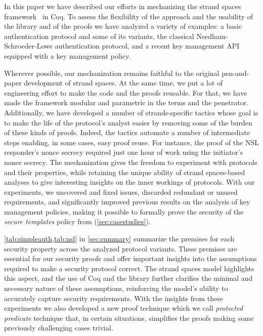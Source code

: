 

In this paper we have described our efforts in mechanizing the strand spaces framework~\cite{FHG98} in Coq.
To assess the flexibility of the approach and the usability of the library and of the proofs we have analyzed a variety of examples: a basic authentication protocol and some of its variants, the classical Needham-Schroeder-Lowe authentication protocol, and a recent key management API equipped with a key management policy.

Wherever possible, our mechanization remains faithful to the original pen-and-paper development of strand spaces.
At the same time, we put a lot of engineering effort to make the code and the proofs reusable.
For that, we have made the framework modular and parametric in the terms and the penetrator.
Additionally, we have developed a number of strands-specific tactics whose goal is to make the life of the protocol's analyst easier by removing some of the burden of these kinds of proofs.
Indeed, the tactics automate a number of intermediate steps enabling, in some cases, easy proof reuse.
For instance, the proof of the NSL responder's nonce secrecy
 required just one hour of work using the initiator's nonce secrecy.
The mechanization
gives the freedom to experiment with protocols and their properties, while retaining the unique ability of strand spaces-based analyses to give interesting insights on the inner workings of protocols.
With our experiments, we uncovered
and fixed issues, discarded
redundant or unused requirements, and significantly improved previous results on the analysis of key management policies, making it possible to formally prove the security of the \emph{secure templates} policy from \cite{BCFS-ccs10} (\cref{sec:casestudies}).

\cref{tab:simpleauth,tab:nsl} in \cref{sec:summary}  summarize the premises for each security property across the analyzed protocol variants. These premises are essential for our security proofs and offer important insights into the assumptions required to make a security protocol correct. The strand spaces model highlights this aspect, and the use of Coq and the \easystrands{} library further clarifies the minimal and necessary nature of these assumptions, reinforcing the model's ability to accurately capture security requirements.
With the insights from these experiments we also developed a new proof technique which we call \emph{protected predicate} technique that, in certain situations, simplifies the proofs making some previously challenging cases trivial.



